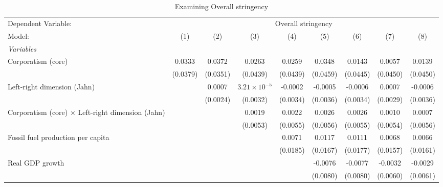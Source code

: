
\begin{table}[htbp]
   \caption{Examining Overall stringency}
   \centering
   \begin{tabular}{lcccccccc}
      \tabularnewline \midrule \midrule
      Dependent Variable: & \multicolumn{8}{c}{Overall stringency}\\
      Model:                                                   & (1)      & (2)      & (3)                   & (4)      & (5)      & (6)      & (7)      & (8)\\  
      \midrule
      \emph{Variables}\\
      Corporatism (core)                                       & 0.0333   & 0.0372   & 0.0263                & 0.0259   & 0.0348   & 0.0143   & 0.0057   & 0.0139\\   
                                                               & (0.0379) & (0.0351) & (0.0439)              & (0.0439) & (0.0459) & (0.0445) & (0.0450) & (0.0450)\\   
      Left-right dimension (Jahn)                              &          & 0.0007   & $3.21\times 10^{-5}$  & -0.0002  & -0.0005  & -0.0006  & 0.0007   & -0.0006\\   
                                                               &          & (0.0024) & (0.0032)              & (0.0034) & (0.0036) & (0.0034) & (0.0029) & (0.0036)\\   
      Corporatism (core) $\times$ Left-right dimension (Jahn)  &          &          & 0.0019                & 0.0022   & 0.0026   & 0.0026   & 0.0010   & 0.0007\\   
                                                               &          &          & (0.0053)              & (0.0055) & (0.0056) & (0.0055) & (0.0054) & (0.0056)\\   
      Fossil fuel production per capita                        &          &          &                       & 0.0071   & 0.0117   & 0.0111   & 0.0068   & 0.0066\\   
                                                               &          &          &                       & (0.0185) & (0.0167) & (0.0177) & (0.0157) & (0.0161)\\   
      Real GDP growth                                          &          &          &                       &          & -0.0076  & -0.0077  & -0.0032  & -0.0029\\   
                                                               &          &          &                       &          & (0.0080) & (0.0080) & (0.0060) & (0.0061)\\   

\end{tabular}
\end{table}
